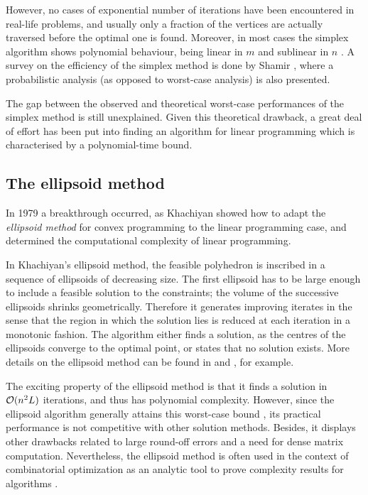 However, no cases of exponential number of iterations have been encountered 
in real-life problems, and usually only a fraction of the vertices
are actually traversed before the optimal one is found.
Moreover, in most cases the simplex algorithm shows 
polynomial behaviour, being linear in $m$ and sublinear in $n$
\cite[p.94]{FangPuthenpura93}.
A survey on the efficiency of the simplex method is done by Shamir 
\cite{Shamir87}, where a probabilistic analysis (as opposed to
worst-case analysis) is also presented.

The gap between the observed and theoretical worst-case performances
of the simplex method is still unexplained.
Given this theoretical drawback, a great deal of effort 
has been put into finding an
algorithm for linear programming which is 
characterised by a polynomial-time bound.

%
%
\subsection{The ellipsoid method}

In 1979 a breakthrough occurred, as Khachiyan showed how to adapt 
the {\em ellipsoid method} for convex programming
to the linear programming case,
and determined the computational complexity of linear programming.

In Khachiyan's ellipsoid method, the feasible polyhedron is inscribed in 
a sequence of ellipsoids of decreasing size. 
The first ellipsoid has to be large enough to include a feasible 
solution to the constraints; the volume of the successive ellipsoids 
shrinks geometrically. Therefore it generates improving iterates
in the sense that the region in which the solution lies is 
reduced at each iteration in a monotonic fashion.
The algorithm either finds a solution, as the centres of the ellipsoids
converge to the optimal point, or states that no solution exists.
More details on the ellipsoid method can be found in 
\cite[Chapter~13]{Schrijver86} and \cite[Chapter~I.6]{ip:NemhauserWolsey88},
for example.

The exciting property of the ellipsoid method is that it finds a 
solution in $\mathcal{O}(n^2L)$ iterations, and thus has polynomial complexity. 
However, since the ellipsoid algorithm generally attains
this worst-case bound \cite{GoldfarbTodd82},
its practical performance is not competitive
with other solution methods. Besides, it displays other drawbacks
related to large round-off errors and a need for dense matrix computation.
Nevertheless, the ellipsoid method is often used in the context of
combinatorial optimization as an analytic tool to prove complexity
results for algorithms \cite{ip:NemhauserWolsey88}.


